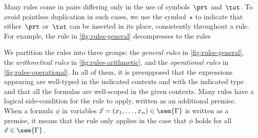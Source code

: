 Many rules come in pairs differing only in the use of symbols~$\prt$ and~$\tot$. To avoid pointless duplication in such cases, we use the symbol~$\star$ to indicate that either~$\prt$ or~$\tot$ can be inserted in its place, consistently throughout a rule. For example, the rule  in \cref{fig:rules-general} decompresses to the rules
%
\begin{mathpar}

\end{mathpar}
%
We partition the rules into three groups:
the \emph{general rules} in \cref{fig:rules-general},
the \emph{arithmetical rules} in \cref{fig:rules-arithmetic}, and
the \emph{operational rules} in \cref{fig:rules-operational}.
%
In all of them, it is presupposed that the expressions appearing are well-typed in the indicated contexts and with the indicated type and that all the formulas are well-scoped in the given contexts.
%
Many rules have a logical side-condition for the rule to apply, written as an additional premise. 
When a formula $\phi$ in variables $\vec{x} = (x_1, \ldots, x_n) \in \sem{\Gamma}$  is written as a premise, it means that the rule only applies in the case that $\phi$ holds for all $\vec{x} \in \sem{\Gamma}$.

